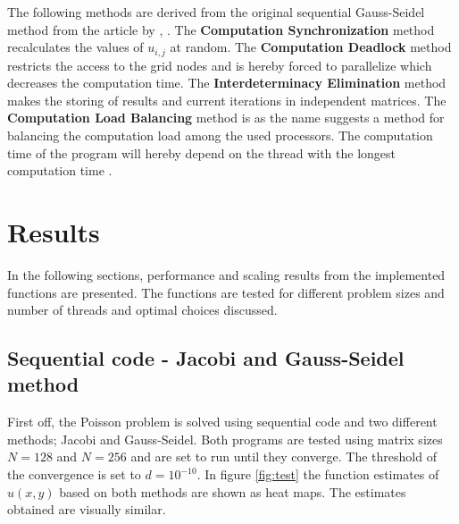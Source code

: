 The following methods are derived from the original sequential Gauss-Seidel method from the article  by \citeauthor{C3}, \cite{C3}. 
The \textbf{Computation Synchronization} method recalculates the values of $u_{i,j}$ at random.  
The \textbf{Computation Deadlock} method restricts the access to the grid nodes and is hereby forced to parallelize which decreases the computation time.
The \textbf{Interdeterminacy Elimination} method makes the storing of results and current iterations in independent matrices.
The \textbf{Computation Load Balancing} method is as the name suggests a method for balancing the computation load among the used processors. The computation time of the program will hereby depend on the thread with the longest computation time \cite{C3}. 

\newpage

\section{Results}
In the following sections, performance and scaling results from the implemented functions are presented. The functions are tested for different problem sizes and number of threads and optimal choices discussed.

\subsection{Sequential code - Jacobi and Gauss-Seidel method}
First off, the Poisson problem is solved using sequential code and two different methods; Jacobi and Gauss-Seidel. Both programs are tested using matrix sizes $N = 128$ and $N = 256$ and are set to run until they converge. The threshold of the convergence is set to $d = 10 ^{-10}$. In figure \ref{fig:test} the function estimates of $u(x,y)$ based on both methods are shown as heat maps. The estimates obtained are visually similar. 

